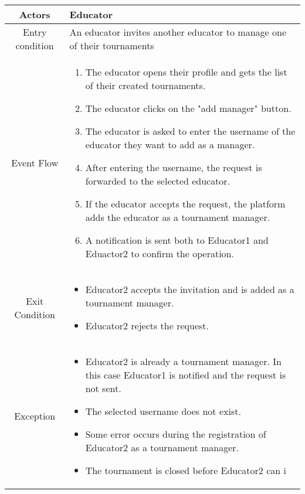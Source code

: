 \documentclass[a4paper, 11pt, titlepage]{article}
\begin{document}
\begin{center}
    \begin{tabularx}{\linewidth} {|c|X|}
        \hline 
        Actors & Educator\\
        \hline 
        Entry condition &
        An educator invites another educator to manage one of their tournaments\\
        \hline 
        Event Flow &
        \begin{enumerate}
            \item The educator opens their profile and gets the list of their created tournaments.
            \item The educator clicks on the "add manager" button.
            \item The educator is asked to enter the username of the educator they want to add as a manager.
            \item After entering the username, the request is forwarded to the selected educator. 
            \item If the educator accepts the request, the platform adds the educator as a tournament manager.
            \item A notification is sent both to Educator1 and Eduactor2 to confirm the operation. 
        \end{enumerate}\\
        \hline 
        Exit Condition &
        \begin{itemize}
            \item Educator2 accepts the invitation and is added as a tournament manager.
            \item Educator2 rejects the request.
        \end{itemize}\\
        \hline 
        Exception & 
        \begin{itemize}
            \item Educator2 is already a tournament manager. In this case Educator1 is notified and the request is not sent.
            \item The selected username does not exist.
            \item Some error occurs during the registration of Educator2 as a tournament manager.
            \item The tournament is closed before Educator2 can i  
        \end{itemize}\\
        \hline
    \end{tabularx}

\end{center}
\end{document}
